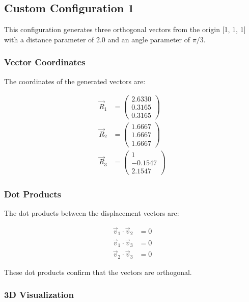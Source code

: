 \subsection{Custom Configuration 1}

This configuration generates three orthogonal vectors from the origin [1, 1, 1] with a distance parameter of 2.0 and an angle parameter of $\pi/3$.

\subsubsection{Vector Coordinates}

The coordinates of the generated vectors are:

\begin{align}
\vec{R}_1 &= \begin{pmatrix} 2.6330 \\ 0.3165 \\ 0.3165 \end{pmatrix} \\
\vec{R}_2 &= \begin{pmatrix} 1.6667 \\ 1.6667 \\ 1.6667 \end{pmatrix} \\
\vec{R}_3 &= \begin{pmatrix} 1 \\ -0.1547 \\ 2.1547 \end{pmatrix}
\end{align}

\subsubsection{Dot Products}

The dot products between the displacement vectors are:

\begin{align}
\vec{v}_1 \cdot \vec{v}_2 &= 0 \\
\vec{v}_1 \cdot \vec{v}_3 &= 0 \\
\vec{v}_2 \cdot \vec{v}_3 &= 0
\end{align}

These dot products confirm that the vectors are orthogonal.

\subsubsection{3D Visualization}

